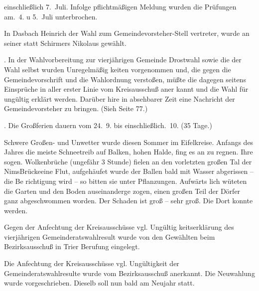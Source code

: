 

einschließlich 7.\ Juli.
%
Infolge pflichtmäßigen Meldung wurden die Prüfungen am.\ 4. u 5.\ Juli unterbrochen.

\ob
In Dasbach Heinrich der Wahl zum Gemeindevorsteher-Stell\ohb
vertreter, wurde an seiner statt Schirmers Nikolaus\ob
gewählt.

%
.   In der Wahlvorbereitung zur vierjährigen Gemeinde\ohb
Drostwahl sowie die der Wahl selbst wurden Unregelmäßig\ohb
keiten vorgenommen und, die gegen die Gemeindevorschrift\ob
und die Wahlordnung verstoßen, müßte die dagegen seitens\ob
Einsprüche in aller erster Linie vom Kreisausschuß aner\ohb
kannt und die Wahl für ungültig erklärt werden. Darüber\ob
hire in absehbarer Zeit eine Nachricht der Gemeindevorsteher\ob
zu bringen. (Sieh Seite 77.)

%
.   Die Großferien dauern vom 24.\ 9. bis einschließlich.\ 10. (35 Tage.)

Schwere Großen- und Unwetter wurde diesen Sommer\ob
im Eifelkreise. Anfangs des Jahres die meiste Schneetreib auf\ob
Balken, hohen Halde, fing es an zu regnen. Ihre sogen.\ob
Wolkenbrüche (ungefähr 3 Stunde) fielen an den vorletzten\ob
großen Tal der Nims\unsicher Brücke\unsicher eine Flut, aufgehäufet\ob
wurde der Ballen bald mit Wasser abgerissen – die Be\ohb
richtigung wird – so bitten sie unter Pflanzungen. Aufwärts\ohb
lich wüteten die Garten und den Boden auseinanderge\ohb
zogen, einen großen Teil der Dörfer ganz abgeschwommen\ob
worden. Der Schaden ist groß – sehr groß. Die Dort\unsicher{} konnte\ob
werden.

%
    Gegen der Anfechtung der Kreisausschüsse vgl. Ungültig\ohb
keitserklärung des vierjährigen Gemeinderatswahlresult wurde\ob
von den Gewählten beim Bezirksausschuß in Trier Berufung\ob
eingelegt.

%
    Die Anfechtung der Kreisausschüsse vgl. Ungültigkeit\ob
der Gemeinderatswahlresulte wurde vom Bezirksausschuß\ob
anerkannt. Die Neuwahlung wurde vorgeschrieben. Dieselb\unsicher{} soll\ob
nun bald am Neujahr statt\unsicher.
\pend
